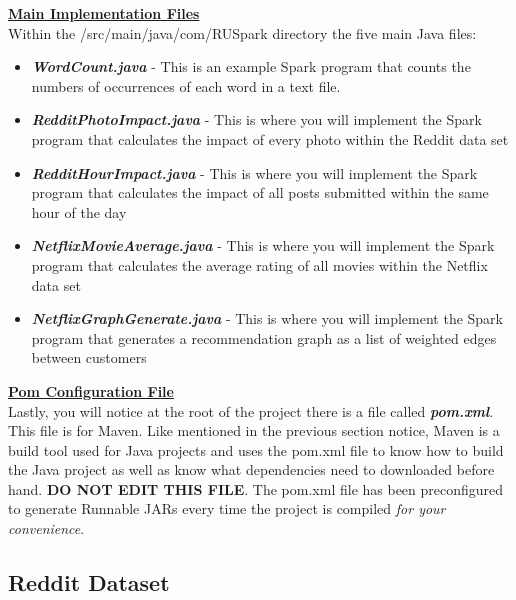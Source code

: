 \documentclass{article}
\begin{document}
\noindent \textbf{\underline{Main Implementation Files}} \vspace{0.2cm} \\
\noindent Within the /src/main/java/com/RUSpark directory the five main Java files:
\begin{itemize}
   \item \textbf{\textit{WordCount.java}} - This is an example Spark program that counts the numbers of occurrences of each word in a text file.
    \item \textbf{\textit{RedditPhotoImpact.java}} - This is where you will implement the Spark program that calculates the impact of every photo within the Reddit data set
    \item \textbf{\textit{RedditHourImpact.java}} - This is where you will implement the Spark program that calculates the impact of all posts submitted within the same hour of the day
    \item \textbf{\textit{NetflixMovieAverage.java}} - This is where you will implement the Spark program that calculates the average rating of all movies within the Netflix data set 
    \item \textbf{\textit{NetflixGraphGenerate.java}} - This is where you will implement the Spark program that generates a recommendation graph as a list of weighted edges between customers
\end{itemize}

\noindent \textbf{\underline{Pom Configuration File}} \vspace{0.2cm} \\
\noindent Lastly, you will notice at the root of the project there is a file called \textbf{\textit{pom.xml}}. This file is for Maven. Like mentioned in the previous section notice, Maven is a build tool used for Java projects and uses the pom.xml file to know how to build the Java project as well as know what dependencies need to downloaded before hand. \textbf{DO NOT EDIT THIS FILE}. The pom.xml file has been preconfigured to generate Runnable JARs every time the project is compiled \textit{for your convenience}. 



\subsection{Reddit Dataset}
\end{document}
